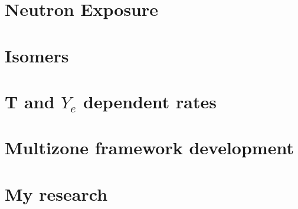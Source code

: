 \documentclass{article}
\begin{document}
\section*{Neutron Exposure}
\section*{Isomers}


\section*{T and $Y_{e}$ dependent rates}
\section*{Multizone framework development}
\section*{My research}

\singlespacing



\end{document}
